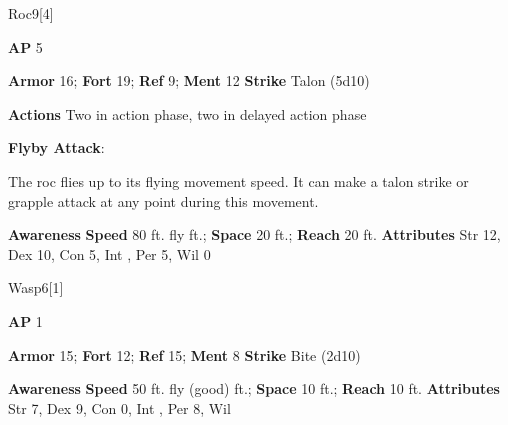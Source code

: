 \begin{monsection}{Roc}{9}[4]
\vspace{-1em}\vspace{-1em}
\begin{spellcontent}
\begin{spelltargetinginfo}
{\textbf{AP} 5}

\pari \textbf{Armor} 16;
\textbf{Fort} 19;
\textbf{Ref} 9;
\textbf{Ment} 12
\pari \textbf{Strike} Talon  (5d10)


\pari \textbf{Actions} Two in action phase, two in delayed action phase
\end{spelltargetinginfo}


\begin{spelleffects}

\pari
\textbf{Flyby Attack}:

The roc flies up to its flying movement speed.
It can make a talon strike or grapple attack at any point during this movement.




\end{spelleffects}

\end{spellcontent}

\begin{monsterfooter}
\pari \textbf{Awareness} 
\pari \textbf{Speed} 80 ft. fly ft.;
\textbf{Space} 20 ft.;
\textbf{Reach} 20 ft.
\pari \textbf{Attributes}
Str 12,
Dex 10,
Con 5,
Int ,
Per 5,
Wil 0
\end{monsterfooter}
\end{monsection}



\begin{monsection}[Giant]{Wasp}{6}[1]
\vspace{-1em}\vspace{-1em}
\begin{spellcontent}
\begin{spelltargetinginfo}
{\textbf{AP} 1}

\pari \textbf{Armor} 15;
\textbf{Fort} 12;
\textbf{Ref} 15;
\textbf{Ment} 8
\pari \textbf{Strike} Bite  (2d10)



\end{spelltargetinginfo}


\end{spellcontent}

\begin{monsterfooter}
\pari \textbf{Awareness} 
\pari \textbf{Speed} 50 ft. fly (good) ft.;
\textbf{Space} 10 ft.;
\textbf{Reach} 10 ft.
\pari \textbf{Attributes}
Str 7,
Dex 9,
Con 0,
Int ,
Per 8,
Wil 
\end{monsterfooter}
\end{monsection}



